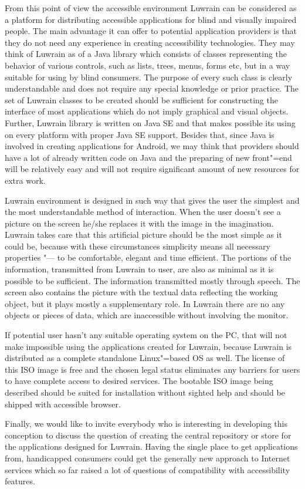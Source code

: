 \documentclass[10pt, a5paper]{article}
\begin{document}
From this point of view the accessible environment Luwrain can be considered as a platform for distributing accessible applications for blind and visually impaired people. The main advantage it can offer to potential application providers is that they do not need any experience in creating accessibility technologies. They may think of Luwrain as of a Java library which consists of classes representing the behavior of various controls, such as lists, trees, menus, forms etc, but in a way suitable for using by blind consumers. The purpose of every such class is clearly understandable and does not require any special knowledge or prior practice. The set of Luwrain classes to be created should be sufficient for constructing the interface of most applications which do not imply graphical and visual objects. Further, Luwrain library is written on Java SE and that makes possible its using on every platform with proper Java SE support. Besides that, since Java is involved in creating applications for Android, we may think that providers should have a lot of already written code on Java and the preparing of new front"=end will be relatively easy and will not require significant amount of new resources for extra work.

Luwrain environment is designed in such way that gives the user the simplest and the most understandable method of interaction. When the user doesn't see a picture on the screen he/she replaces it with the image in the imagination. Luwrain takes care that this artificial picture should be the most simple as it could be, because with these circumstances simplicity means all necessary properties "--- to be comfortable, elegant and time efficient. The portions of the information, transmitted from Luwrain to user, are also as minimal as it is possible to be sufficient. The information transmitted mostly through speech. The screen also contains the picture with the textual data reflecting the working object, but it plays mostly a supplementary role. In Luwrain there are no any objects or pieces of data, which are inaccessible without involving the monitor.

If potential user hasn't any suitable operating system on the PC, that will not make impossible using the applications created for Luwrain, because Luwrain is distributed as a complete standalone Linux"=based OS as well. The license of this ISO image is free and the chosen legal status eliminates any barriers for users to have complete access to desired services. The bootable ISO image being described should be suited for installation without sighted help and should be shipped with accessible browser.

Finally, we would like to invite everybody who is interesting in developing this conception to discuss the question of creating the central repository or store for the applications designed for Luwrain. Having the single place to get applications from, handicapped consumers could get the generally new approach to Internet services which so far raised a lot of questions of compatibility with accessibility features.
\end{document}

